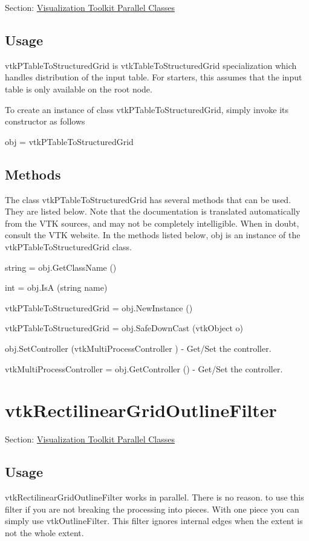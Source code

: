 Section\-: \hyperlink{sec_vtkparallel}{Visualization Toolkit Parallel Classes} \hypertarget{vtkwidgets_vtkxyplotwidget_Usage}{}\subsection{Usage}\label{vtkwidgets_vtkxyplotwidget_Usage}
vtk\-P\-Table\-To\-Structured\-Grid is vtk\-Table\-To\-Structured\-Grid specialization which handles distribution of the input table. For starters, this assumes that the input table is only available on the root node.

To create an instance of class vtk\-P\-Table\-To\-Structured\-Grid, simply invoke its constructor as follows \begin{DoxyVerb}  obj = vtkPTableToStructuredGrid
\end{DoxyVerb}
 \hypertarget{vtkwidgets_vtkxyplotwidget_Methods}{}\subsection{Methods}\label{vtkwidgets_vtkxyplotwidget_Methods}
The class vtk\-P\-Table\-To\-Structured\-Grid has several methods that can be used. They are listed below. Note that the documentation is translated automatically from the V\-T\-K sources, and may not be completely intelligible. When in doubt, consult the V\-T\-K website. In the methods listed below, {\ttfamily obj} is an instance of the vtk\-P\-Table\-To\-Structured\-Grid class. 
\begin{DoxyItemize}
\item {\ttfamily string = obj.\-Get\-Class\-Name ()}  
\item {\ttfamily int = obj.\-Is\-A (string name)}  
\item {\ttfamily vtk\-P\-Table\-To\-Structured\-Grid = obj.\-New\-Instance ()}  
\item {\ttfamily vtk\-P\-Table\-To\-Structured\-Grid = obj.\-Safe\-Down\-Cast (vtk\-Object o)}  
\item {\ttfamily obj.\-Set\-Controller (vtk\-Multi\-Process\-Controller )} -\/ Get/\-Set the controller.  
\item {\ttfamily vtk\-Multi\-Process\-Controller = obj.\-Get\-Controller ()} -\/ Get/\-Set the controller.  
\end{DoxyItemize}\hypertarget{vtkparallel_vtkrectilineargridoutlinefilter}{}\section{vtk\-Rectilinear\-Grid\-Outline\-Filter}\label{vtkparallel_vtkrectilineargridoutlinefilter}
Section\-: \hyperlink{sec_vtkparallel}{Visualization Toolkit Parallel Classes} \hypertarget{vtkwidgets_vtkxyplotwidget_Usage}{}\subsection{Usage}\label{vtkwidgets_vtkxyplotwidget_Usage}
vtk\-Rectilinear\-Grid\-Outline\-Filter works in parallel. There is no reason. to use this filter if you are not breaking the processing into pieces. With one piece you can simply use vtk\-Outline\-Filter. This filter ignores internal edges when the extent is not the whole extent.

